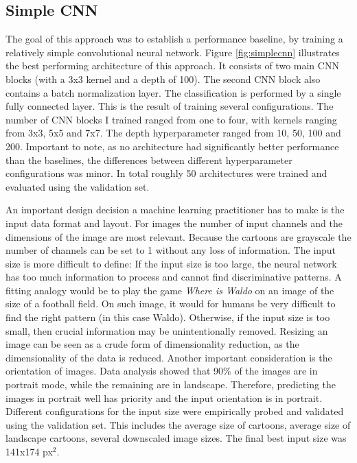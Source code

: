 \documentclass[draft,final,oneside]{vutinfth} %
\begin{document}
\subsection{Simple CNN}
The goal of this approach was to establish a performance baseline, by training a relatively simple convolutional neural network. Figure \ref{fig:simplecnn} illustrates the best performing architecture of this approach. It consists of two main CNN blocks (with a 3x3 kernel and a depth of 100). The second CNN block also contains a batch normalization layer. The classification is performed by a single fully connected layer. This is the result of training several configurations. The number of CNN blocks I trained ranged from one to four, with kernels ranging from 3x3, 5x5 and 7x7. The depth hyperparameter ranged from 10, 50, 100 and 200. Important to note, as no architecture had significantly better performance than the baselines, the differences between different hyperparameter configurations was minor. In total roughly 50 architectures were trained and evaluated using the validation set.

An important design decision a machine learning practitioner has to make is the input data format and layout. For images the number of input channels and the dimensions of the image are most relevant. Because the cartoons are grayscale the number of channels can be set to 1 without any loss of information. The input size is more difficult to define: If the input size is too large, the neural network has too much information to process and cannot find discriminative patterns. A fitting analogy would be to play the game \textit{Where is Waldo} on an image of the size of a football field. On such image, it would for humans be very difficult to find the right pattern (in this case Waldo). Otherwise, if the input size is too small, then crucial information may be unintentionally removed. Resizing an image can be seen as a crude form of dimensionality reduction, as the dimensionality of the data is reduced. Another important consideration is the orientation of images. Data analysis showed that 90\% of the images are in portrait mode, while the remaining are in landscape. Therefore, predicting the images in portrait well has priority and the input orientation is in portrait. Different configurations for the input size were empirically probed and validated using the validation set. This includes the average size of cartoons, average size of landscape cartoons, several downscaled image sizes. The final best input size was 141x174 px$^2$.
\end{document}
